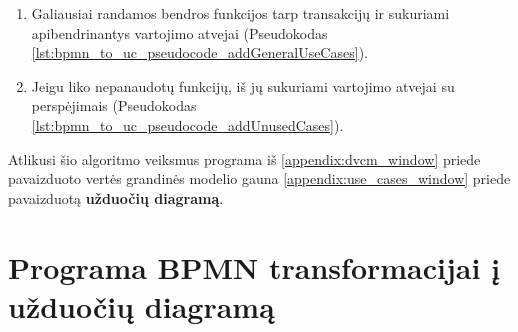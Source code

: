 \documentclass{VUMIFInfBakalaurinis}
\begin{document}
\begin{enumerate}
	\item Galiausiai randamos bendros funkcijos tarp transakcijų ir sukuriami apibendrinantys vartojimo atvejai (Pseudokodas  \ref{lst:bpmn_to_uc_pseudocode_addGeneralUseCases}).
	
	\item Jeigu liko nepanaudotų funkcijų, iš jų sukuriami vartojimo atvejai su perspėjimais (Pseudokodas \ref{lst:bpmn_to_uc_pseudocode_addUnusedCases}).
	
\end{enumerate} 

Atlikusi šio algoritmo veiksmus programa iš \ref{appendix:dvcm_window} priede pavaizduoto vertės grandinės modelio gauna \ref{appendix:use_cases_window} priede pavaizduotą \textbf{užduočių diagramą}.





\section{Programa \textbf{BPMN} transformacijai į \textbf{užduočių diagramą}}   





\printbibliography[heading=bibintoc] %
\end{document}
